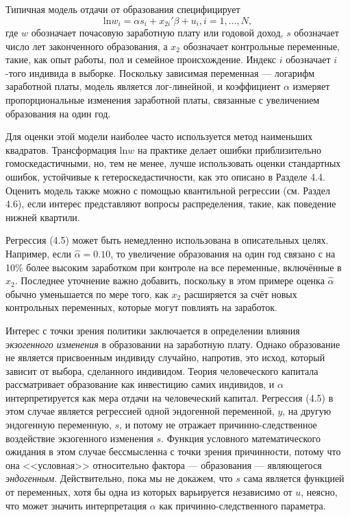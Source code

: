 Типичная модель отдачи от образования специфицирует
\begin{equation}
\mathrm{ln} w_i = \alpha s_i + x_{2i}' \beta + u_i, i=1, ..., N,
\end{equation}
где $w$ обозначает почасовую заработную плату или годовой доход, $s$ обозначает число лет законченного образования, а $x_{2}$ обозначает контрольные переменные, такие, как опыт работы, пол и семейное происхождение. Индекс $i$ обозначает $i$-того индивида в выборке. Поскольку зависимая переменная --- логарифм заработной платы, модель является лог-линейной, и коэффициент $\alpha$  измеряет пропорциональные изменения заработной платы, связанные с увеличением образования на один год.

Для оценки этой модели наиболее часто используется метод наименьших квадратов. Трансформация ln$w$ на практике делает ошибки приблизительно гомоскедастичными, но, тем не менее, лучше использовать оценки стандартных ошибок, устойчивые к гетероскедастичности, как это описано в Разделе 4.4. Оценить модель также можно с помощью квантильной регрессии (см. Раздел 4.6), если интерес представляют вопросы распределения, такие, как поведение нижней квартили. 

Регрессия (4.5) может быть немедленно использована в описательных целях. Например, если $\hat{\alpha}=0.10$, то увеличение образования на один год связано с на 10\% более высоким заработком при контроле на все переменные, включённые в $x_{2}$. Последнее уточнение важно добавить, поскольку в этом примере оценка  $\hat{\alpha}$ обычно уменьшается по мере того, как $x_{2}$ расширяется за счёт новых контрольных переменных, которые могут повлиять на заработок.

Интерес с точки зрения политики заключается в определении влияния \textit{экзогенного изменения} в образовании на заработную плату. Однако образование не является присвоенным индивиду случайно, напротив, это исход, который зависит от выбора, сделанного индивидом. Теория человеческого капитала рассматривает образование как инвестицию самих индивидов, и $\alpha$ интерпретируется как мера отдачи на человеческий капитал. Регрессия (4.5) в этом случае является регрессией одной эндогенной переменной, $y$, на другую эндогенную переменную, $s$, и потому не отражает причинно-следственное воздействие экзогенного изменения $s$. Функция условного математического ожидания в этом случае бессмысленна с точки зрения причинности, потому что она <<условная>> относительно фактора --- образования --- являющегося \textit{эндогенным}. Действительно, пока мы не докажем, что $s$ сама является функцией от переменных, хотя бы одна из которых варьируется независимо от $u$, неясно, что может значить интерпретация $\alpha$ как причинно-следственного параметра.

